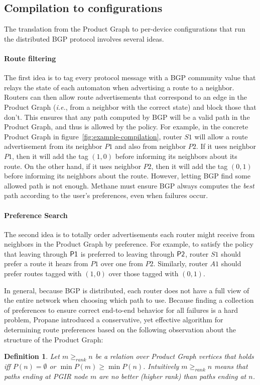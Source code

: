 \documentclass{sig-alternate-10pt}
\newcommand{\IE}{\emph{i.e.}}
\newcommand{\sysname}{{\small \sf Methane}\xspace}
\newcommand{\para}[1]{\paragraph*{\textbf{#1}}}
\newtheorem{defn}{Definition}
\begin{document}
\subsection{Compilation to configurations}

The translation from the Product Graph to per-device configurations that run the distributed BGP protocol involves several ideas. 

\para{Route filtering}

The first idea is to tag every protocol message with a BGP community value that relays the state of each automaton when advertising a route to a neighbor. Routers can then allow route advertisements that correspond to an edge in the Product Graph (\IE, from a neighbor with the correct state) and block those that don't. This ensures that any path computed by BGP will be a valid path in the Product Graph, and thus is allowed by the policy. For example, in the concrete Product Graph in figure~\ref{fig:example-compilation}, router $S1$ will allow a route advertisement from its neighbor $P1$ and also from neighbor $P2$. If it uses neighbor $P1$, then it will add the tag $(1,0)$ before informing its neighbors about its route. On the other hand, if it uses neighbor $P2$, then it will add the tag $(0,1)$ before informing its neighbors about the route.
%
However, letting BGP find some allowed path is not enough. \sysname must ensure BGP always computes the \emph{best} path according to the user's preferences, even when failures occur. 


\para{Preference Search}
The second idea is to totally order advertisements each router might receive from neighbors in the Product Graph by preference. For example, to satisfy the policy that leaving through $\sf{P1}$ is preferred to leaving through $\sf{P2}$, router $S1$ should prefer a route it hears from $P1$ over one from $P2$. Similarly, router $A1$ should prefer routes tagged with $(1,0)$ over those tagged with $(0,1)$.

In general, because BGP is distributed, each router does not have a full view of the entire network when choosing which path to use. Because finding a collection of preferences to ensure correct end-to-end behavior for all failures is a hard problem, Propane introduced a conservative, yet effective algorithm for determining route preferences based on the following observation about the structure of the Product Graph:

\begin{defn}
Let $m \geq_{rank} n$ be a relation over Product Graph vertices that holds iff $P(n) = \emptyset$ or $\min P(m) \geq \min P(n)$. Intuitively $m \geq_{rank} n$ means that paths ending at PGIR node $m$ are no better (higher rank) than paths ending at $n$.
%
\end{defn}
\noindent
%
\end{document}
